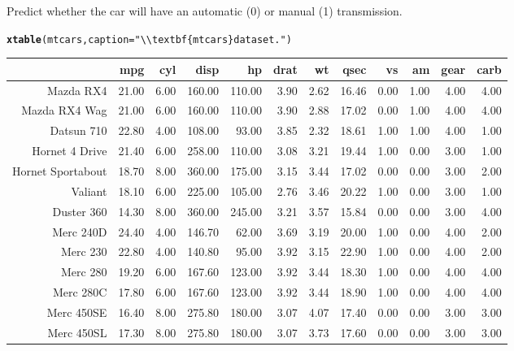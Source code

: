 \documentclass{article}\usepackage[]{graphicx}\usepackage[]{color}
\makeatletter
\newcommand{\hlstr}[1]{\textcolor[rgb]{0.192,0.494,0.8}{#1}}%
\newcommand{\hlstd}[1]{\textcolor[rgb]{0.345,0.345,0.345}{#1}}%
\newcommand{\hlkwc}[1]{\textcolor[rgb]{0.333,0.667,0.333}{#1}}%
\newcommand{\hlkwd}[1]{\textcolor[rgb]{0.737,0.353,0.396}{\textbf{#1}}}%
\newenvironment{kframe}{%
 \def\at@end@of@kframe{}%
 \ifinner\ifhmode%
  \def\at@end@of@kframe{\end{minipage}}%
  \begin{minipage}{\columnwidth}%
 \fi\fi%
 \def\FrameCommand##1{\hskip\@totalleftmargin \hskip-\fboxsep
 \colorbox{shadecolor}{##1}\hskip-\fboxsep
     \hskip-\linewidth \hskip-\@totalleftmargin \hskip\columnwidth}%
 \MakeFramed {\advance\hsize-\width
   \@totalleftmargin\z@ \linewidth\hsize
   \@setminipage}}%
 {\par\unskip\endMakeFramed%
 \at@end@of@kframe}
\makeatother
\begin{document}
Predict whether the car will have an automatic (0) or manual (1) transmission.

\begin{kframe}
\begin{alltt}
\hlkwd{xtable}\hlstd{(mtcars,} \hlkwc{caption} \hlstd{=} \hlstr{"\textbackslash{}\textbackslash{}textbf\{mtcars\} data set."}\hlstd{)}
\end{alltt}
\end{kframe}%
\begin{table}[ht]
\centering
\begin{tabular}{rrrrrrrrrrrr}
  \hline
 & mpg & cyl & disp & hp & drat & wt & qsec & vs & am & gear & carb \\ 
  \hline
Mazda RX4 & 21.00 & 6.00 & 160.00 & 110.00 & 3.90 & 2.62 & 16.46 & 0.00 & 1.00 & 4.00 & 4.00 \\ 
  Mazda RX4 Wag & 21.00 & 6.00 & 160.00 & 110.00 & 3.90 & 2.88 & 17.02 & 0.00 & 1.00 & 4.00 & 4.00 \\ 
  Datsun 710 & 22.80 & 4.00 & 108.00 & 93.00 & 3.85 & 2.32 & 18.61 & 1.00 & 1.00 & 4.00 & 1.00 \\ 
  Hornet 4 Drive & 21.40 & 6.00 & 258.00 & 110.00 & 3.08 & 3.21 & 19.44 & 1.00 & 0.00 & 3.00 & 1.00 \\ 
  Hornet Sportabout & 18.70 & 8.00 & 360.00 & 175.00 & 3.15 & 3.44 & 17.02 & 0.00 & 0.00 & 3.00 & 2.00 \\ 
  Valiant & 18.10 & 6.00 & 225.00 & 105.00 & 2.76 & 3.46 & 20.22 & 1.00 & 0.00 & 3.00 & 1.00 \\ 
  Duster 360 & 14.30 & 8.00 & 360.00 & 245.00 & 3.21 & 3.57 & 15.84 & 0.00 & 0.00 & 3.00 & 4.00 \\ 
  Merc 240D & 24.40 & 4.00 & 146.70 & 62.00 & 3.69 & 3.19 & 20.00 & 1.00 & 0.00 & 4.00 & 2.00 \\ 
  Merc 230 & 22.80 & 4.00 & 140.80 & 95.00 & 3.92 & 3.15 & 22.90 & 1.00 & 0.00 & 4.00 & 2.00 \\ 
  Merc 280 & 19.20 & 6.00 & 167.60 & 123.00 & 3.92 & 3.44 & 18.30 & 1.00 & 0.00 & 4.00 & 4.00 \\ 
  Merc 280C & 17.80 & 6.00 & 167.60 & 123.00 & 3.92 & 3.44 & 18.90 & 1.00 & 0.00 & 4.00 & 4.00 \\ 
  Merc 450SE & 16.40 & 8.00 & 275.80 & 180.00 & 3.07 & 4.07 & 17.40 & 0.00 & 0.00 & 3.00 & 3.00 \\ 
  Merc 450SL & 17.30 & 8.00 & 275.80 & 180.00 & 3.07 & 3.73 & 17.60 & 0.00 & 0.00 & 3.00 & 3.00 \\ 

\end{tabular}
\end{table}
\end{document}
